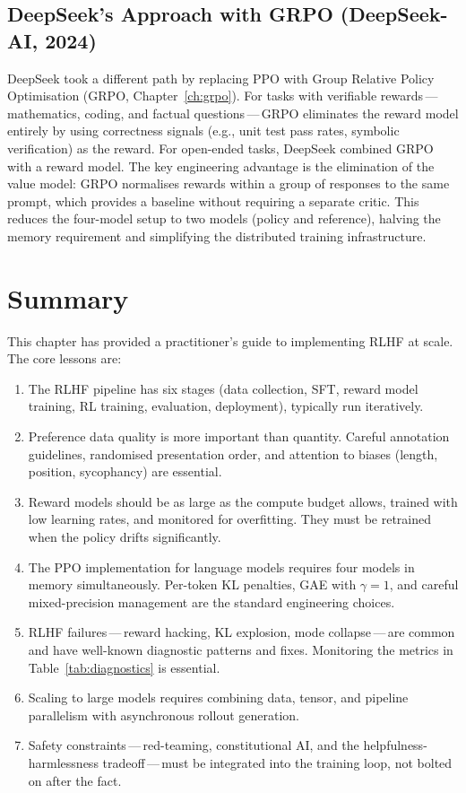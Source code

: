 \subsection{DeepSeek's Approach with GRPO (DeepSeek-AI, 2024)}

DeepSeek took a different path by replacing PPO with Group Relative Policy Optimisation (GRPO, Chapter~\ref{ch:grpo}). For tasks with verifiable rewards\,---\,mathematics, coding, and factual questions\,---\,GRPO eliminates the reward model entirely by using correctness signals (e.g., unit test pass rates, symbolic verification) as the reward. For open-ended tasks, DeepSeek combined GRPO with a reward model. The key engineering advantage is the elimination of the value model: GRPO normalises rewards within a group of responses to the same prompt, which provides a baseline without requiring a separate critic. This reduces the four-model setup to two models (policy and reference), halving the memory requirement and simplifying the distributed training infrastructure.

\section{Summary}
\label{sec:ch14-summary}

This chapter has provided a practitioner's guide to implementing RLHF at scale. The core lessons are:

\begin{enumerate}
  \item The RLHF pipeline has six stages (data collection, SFT, reward model training, RL training, evaluation, deployment), typically run iteratively.
  \item Preference data quality is more important than quantity. Careful annotation guidelines, randomised presentation order, and attention to biases (length, position, sycophancy) are essential.
  \item Reward models should be as large as the compute budget allows, trained with low learning rates, and monitored for overfitting. They must be retrained when the policy drifts significantly.
  \item The PPO implementation for language models requires four models in memory simultaneously. Per-token KL penalties, GAE with $\gamma = 1$, and careful mixed-precision management are the standard engineering choices.
  \item RLHF failures\,---\,reward hacking, KL explosion, mode collapse\,---\,are common and have well-known diagnostic patterns and fixes. Monitoring the metrics in Table~\ref{tab:diagnostics} is essential.
  \item Scaling to large models requires combining data, tensor, and pipeline parallelism with asynchronous rollout generation.
  \item Safety constraints\,---\,red-teaming, constitutional AI, and the helpfulness-harmlessness tradeoff\,---\,must be integrated into the training loop, not bolted on after the fact.
\end{enumerate}

